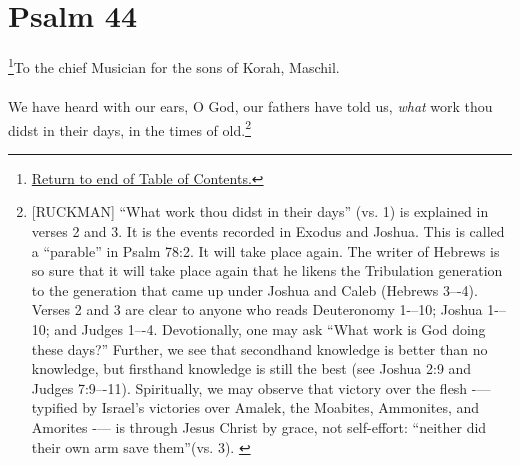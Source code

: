 \chapter{Psalm 44}
\footnote{\textcolor[rgb]{0.00,0.25,0.00}{\hyperlink{TOC}{Return to end of Table of Contents.}}}\textcolor[rgb]{0.00,0.00,1.00}{To the chief Musician for the sons of Korah, Maschil.}\\
\\
\textcolor[rgb]{0.00,0.00,1.00}{We have heard with our ears, O God, our fathers have told us, \emph{what} work thou didst in their days, in the times of old.}\footnote{[RUCKMAN] ``What work thou didst in their days'' (vs. 1) is explained in verses 2 and 3. It is the events recorded in Exodus and Joshua. This is called a ``parable'' in Psalm 78:2. It will take place again. The writer of Hebrews is so sure that it will take place again that he likens the Tribulation generation to the generation that came up under Joshua and Caleb (Hebrews 3–-4). Verses 2 and 3 are clear to anyone who reads Deuteronomy 1-–10; Joshua 1-–10; and Judges 1–-4. Devotionally, one may ask ``What work is God doing these days?'' Further, we see that secondhand knowledge is better than no knowledge, but firsthand knowledge is still the best (see Joshua 2:9 and Judges 7:9–-11). Spiritually, we may observe that victory over the flesh -— typified by Israel’s victories over Amalek, the Moabites, Ammonites, and Amorites -— is through Jesus Christ by grace, not self-effort: ``neither did their own arm save them''(vs. 3). \cite{Ruckman1992Psalms} }


